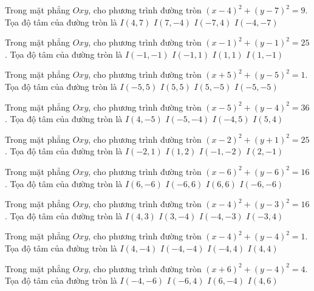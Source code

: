 \begin{ex}
Trong mặt phẳng $Oxy$, cho phương trình đường tròn $(x -4)^2   + (y -7)^2 = 9$. Tọa độ tâm của đường tròn là
\choice
{ \True $I(4, 7)$ }
{ $I(7, -4)$ }
{ $I(-7, 4)$ }
{ $I(-4, -7)$ }
\end{ex}

\begin{ex}
Trong mặt phẳng $Oxy$, cho phương trình đường tròn $(x -1)^2   + (y -1)^2 = 25$. Tọa độ tâm của đường tròn là
\choice
{ $I(-1, -1)$ }
{ $I(-1, 1)$ }
{ \True $I(1, 1)$ }
{ $I(1, -1)$ }
\end{ex}

\begin{ex}
Trong mặt phẳng $Oxy$, cho phương trình đường tròn $(x + 5)^2  + (y -5)^2 = 1$. Tọa độ tâm của đường tròn là
\choice
{ \True $I(-5, 5)$ }
{ $I(5, 5)$ }
{ $I(5, -5)$ }
{ $I(-5, -5)$ }
\end{ex}

\begin{ex}
Trong mặt phẳng $Oxy$, cho phương trình đường tròn $(x -5)^2   + (y -4)^2 = 36$. Tọa độ tâm của đường tròn là
\choice
{ $I(4, -5)$ }
{ $I(-5, -4)$ }
{ $I(-4, 5)$ }
{ \True $I(5, 4)$ }
\end{ex}

\begin{ex}
Trong mặt phẳng $Oxy$, cho phương trình đường tròn $(x -2)^2   + (y + 1)^2 = 25$. Tọa độ tâm của đường tròn là
\choice
{ $I(-2, 1)$ }
{ $I(1, 2)$ }
{ $I(-1, -2)$ }
{ \True $I(2, -1)$ }
\end{ex}

\begin{ex}
Trong mặt phẳng $Oxy$, cho phương trình đường tròn $(x -6)^2   + (y -6)^2 = 16$. Tọa độ tâm của đường tròn là
\choice
{ $I(6, -6)$ }
{ $I(-6, 6)$ }
{ \True $I(6, 6)$ }
{ $I(-6, -6)$ }
\end{ex}

\begin{ex}
Trong mặt phẳng $Oxy$, cho phương trình đường tròn $(x -4)^2   + (y -3)^2 = 16$. Tọa độ tâm của đường tròn là
\choice
{ \True $I(4, 3)$ }
{ $I(3, -4)$ }
{ $I(-4, -3)$ }
{ $I(-3, 4)$ }
\end{ex}

\begin{ex}
Trong mặt phẳng $Oxy$, cho phương trình đường tròn $(x -4)^2   + (y -4)^2 = 1$. Tọa độ tâm của đường tròn là
\choice
{ $I(4, -4)$ }
{ $I(-4, -4)$ }
{ $I(-4, 4)$ }
{ \True $I(4, 4)$ }
\end{ex}

\begin{ex}
Trong mặt phẳng $Oxy$, cho phương trình đường tròn $(x + 6)^2  + (y -4)^2 = 4$. Tọa độ tâm của đường tròn là
\choice
{ $I(-4, -6)$ }
{ \True $I(-6, 4)$ }
{ $I(6, -4)$ }
{ $I(4, 6)$ }
\end{ex}

